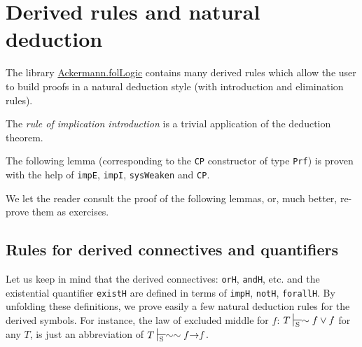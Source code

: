 \section{Derived rules and natural deduction}


 The library 
 \href{../theories/html/hydras.Ackermann.folLogic.html}{Ackermann.folLogic} contains many derived rules which allow the user to build proofs in a natural deduction style (with introduction and elimination rules).


The \emph{rule of implication introduction} is a trivial application of the deduction theorem.


The following lemma (corresponding to the \texttt{CP} constructor of type \texttt{Prf}) is proven with the help of \texttt{impE}, \texttt{impI}, 
\texttt{sysWeaken} and \texttt{CP}.  


We let the reader consult the proof of the following lemmas, or, much better, re-prove them as exercises.





\subsection{Rules for derived connectives and quantifiers}

Let us keep in mind that the derived connectives: \texttt{orH}, \texttt{andH}, etc. and the existential quantifier \texttt{existH}  are defined
in terms of \texttt{impH}, \texttt{notH}, \texttt{forallH}.
By unfolding these definitions, we prove easily a few natural deduction rules for the derived symbols. 
For instance, the law of excluded middle for $f$: $ T\sdash \sim f \vee f$
for any $T$,  is just an abbreviation of $T \sdash \sim\sim f \arrow f$.




